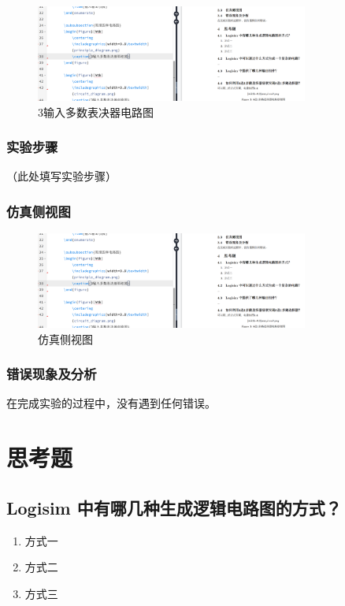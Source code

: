 \documentclass{article}
\begin{document}
\begin{figure}[htb]
  \centering
  \includegraphics[width=0.8\textwidth]{image.png} %
  \caption{3输入多数表决器电路图}
\end{figure}

\subsubsection{实验步骤}
（此处填写实验步骤）

\subsubsection{仿真侧视图}
\begin{figure}[htb]
  \centering
  \includegraphics[width=0.8\textwidth]{image.png} %
  \caption{仿真侧视图}
\end{figure}

\subsubsection{错误现象及分析}
在完成实验的过程中，没有遇到任何错误。



\section{思考题}
\subsection{Logisim 中有哪几种生成逻辑电路图的方式？}
\begin{enumerate}
  \item 方式一
  \item 方式二
  \item 方式三
\end{enumerate}
\end{document}
